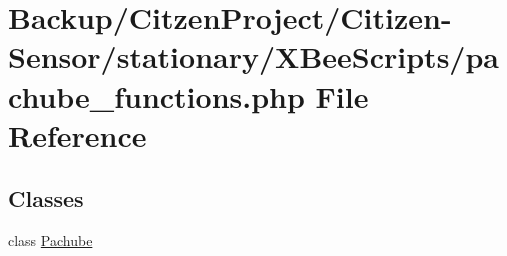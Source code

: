 \hypertarget{pachube__functions_8php}{}\section{Backup/\+Citzen\+Project/\+Citizen-\/\+Sensor/stationary/\+X\+Bee\+Scripts/pachube\+\_\+functions.php File Reference}
\label{pachube__functions_8php}
\subsection*{Classes}
\begin{DoxyCompactItemize}
\item 
class \hyperlink{class_pachube}{Pachube}
\end{DoxyCompactItemize}
